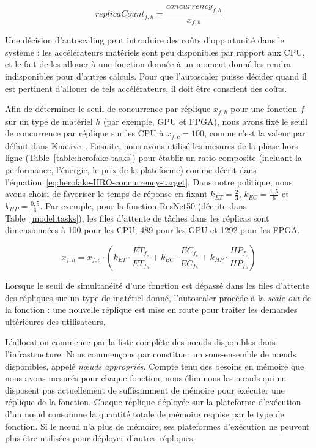 \begin{equation}
    replicaCount_{f, h} = \frac{concurrency_{f, h}}{x_{f, h}}
\label{eq:herofake-HRO-replica-count}
\end{equation}

Une décision d'autoscaling peut introduire des coûts d'opportunité dans le système : les accélérateurs matériels sont peu disponibles par rapport aux CPU, et le fait de les allouer à une fonction donnée à un moment donné les rendra indisponibles pour d'autres calculs. Pour que l'autoscaler puisse décider quand il est pertinent d'allouer de tels accélérateurs, il doit être conscient des coûts. 

Afin de déterminer le seuil de concurrence par réplique $x_{f, h}$ pour une fonction $f$ sur un type de matériel $h$ (par exemple, GPU et FPGA), nous avons fixé le seuil de concurrence par réplique sur les CPU à $x_{f, c} = 100$, comme c'est la valeur par défaut dans Knative~\cite{knative-concurrency}. Ensuite, nous avons utilisé les mesures de la phase hors-ligne (Table~\ref{table:herofake-tasks}) pour établir un ratio composite (incluant la performance, l'énergie, le prix de la plateforme) comme décrit dans l'équation~\ref{eq:herofake-HRO-concurrency-target}. Dans notre politique, nous avons choisi de favoriser le temps de réponse en fixant $k_{ET} = \frac{2}{3}$, $k_{EC} = \frac{1,5}{6}$ et $k_{HP} = \frac{0,5}{6}$. Par exemple, pour la fonction ResNet50 (décrite dans Table~\ref{model:tasks}), les files d'attente de tâches dans les réplicas sont dimensionnées à 100 pour les CPU, 489 pour les GPU et 1292 pour les FPGA.

\begin{equation}
    x_{f, h} = x_{f, c} \cdot (k_{ET} \cdot \frac{ET_{{f}_{c}}}{ET_{{f}_{h}}} + k_{EC} \cdot \frac{EC_{{f}_{c}}}{EC_{{f}_{h}}} + k_{HP} \cdot \frac{HP_{{f}_{c}}}{HP_{{f}_{h}}})
\label{eq:herofake-HRO-concurrency-target}
\end{equation}

Lorsque le seuil de simultanéité d'une fonction est dépassé dans les files d'attente des répliques sur un type de matériel donné, l'autoscaler procède à la \textit{scale out} de la fonction : une nouvelle réplique est mise en route pour traiter les demandes ultérieures des utilisateurs.

L'allocation commence par la liste complète des nœuds disponibles dans l'infrastructure. Nous commençons par constituer un sous-ensemble de nœuds disponibles, appelé \textit{nœuds appropriés}. Compte tenu des besoins en mémoire que nous avons mesurés pour chaque fonction, nous éliminons les nœuds qui ne disposent pas actuellement de suffisamment de mémoire pour exécuter une réplique de la fonction. Chaque réplique déployée sur la plateforme d'exécution d'un nœud consomme la quantité totale de mémoire requise par le type de fonction. Si le nœud n'a plus de mémoire, ses plateformes d'exécution ne peuvent plus être utilisées pour déployer d'autres répliques.

